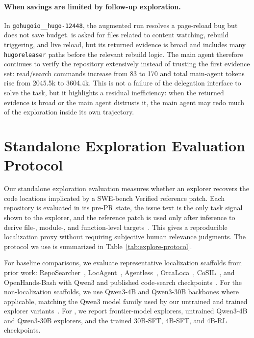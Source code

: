 \paragraph{When savings are limited by follow-up exploration.}
In \texttt{gohugoio\_\_hugo-12448}, the augmented run resolves a page-reload bug but does not save budget.
\approach is asked for files related to content watching, rebuild triggering, and live reload, but its returned evidence is broad and includes many \texttt{hugoreleaser} paths before the relevant rebuild logic.
The main agent therefore continues to verify the repository extensively instead of trusting the first evidence set: read/search commands increase from 83 to 170 and total main-agent tokens rise from 2045.5k to 3604.4k.
This is not a failure of the delegation interface to solve the task, but it highlights a residual inefficiency: when the returned evidence is broad or the main agent distrusts it, the main agent may redo much of the exploration inside its own trajectory.

\section{Standalone Exploration Evaluation Protocol}
\label{app:explore-eval}

Our standalone exploration evaluation measures whether an explorer recovers the code locations implicated by a SWE-bench Verified reference patch.
Each repository is evaluated in its pre-PR state, the issue text is the only task signal shown to the explorer, and the reference patch is used only after inference to derive file-, module-, and function-level targets~\cite{codescout}.
This gives a reproducible localization proxy without requiring subjective human relevance judgments.
The protocol we use is summarized in Table~\ref{tab:explore-protocol}.

For baseline comparisons, we evaluate representative localization scaffolds from prior work: RepoSearcher~\cite{reposearcher}, LocAgent~\cite{locagent}, Agentless~\cite{agentless}, OrcaLoca~\cite{orcaloca}, CoSIL~\cite{cosil}, and OpenHands-Bash with Qwen3 and published code-search checkpoints~\cite{openhands,codescout}.
For the non-\approach localization scaffolds, we use Qwen3-4B and Qwen3-30B backbones where applicable, matching the Qwen3 model family used by our untrained and trained explorer variants~\cite{qwen3}.
For \approach, we report frontier-model explorers, untrained Qwen3-4B and Qwen3-30B explorers, and the trained 30B-SFT, 4B-SFT, and 4B-RL checkpoints.

